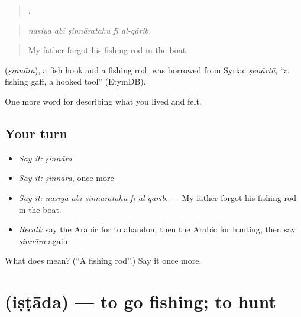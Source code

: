 \begin{quote}
    .
\end{quote}

\begin{quote}
\emph{nasiya abī ṣinnāratahu fī al-qārib.}
\end{quote}

\begin{quote}
My father forgot his fishing rod in the boat.
\end{quote}

\begin{cousinweb}
\textbf{} (\emph{ṣinnāra}), a fish hook and a fishing rod, was borrowed from Syriac \emph{ṣenārtā}, \textquotedblleft{}a fishing gaff, a hooked tool\textquotedblright{} (EtymDB).
\end{cousinweb}

\begin{grammarlens}[title={What you've built}]
One more word for describing what you lived and felt.
\end{grammarlens}

\subsection*{Your turn}
\begin{itemize}
\raggedright
  \item \emph{Say it:} \emph{ṣinnāra}
  \item \emph{Say it:} \emph{ṣinnāra}, once more
  \item \emph{Say it:} \emph{nasiya abī ṣinnāratahu fī al-qārib.} — My father forgot his fishing rod in the boat.
  \item \emph{Recall:} say the Arabic for to abandon, then the Arabic for hunting, then say \emph{ṣinnāra} again
\end{itemize}

\begin{tcolorbox}[breakable,colback=teal!4,colframe=teal!35!black,title={Before you move on}]
What does  mean? (\textquotedblleft{}A fishing rod\textquotedblright{}.) Say it once more.
\end{tcolorbox}
\section[\texorpdfstring{\ar{اصطاد} (iṣṭāda)}{اصطاد (iṣṭāda)}]{ (iṣṭāda) — to go fishing; to hunt}

\label{lesson:AR-C536-istada}



